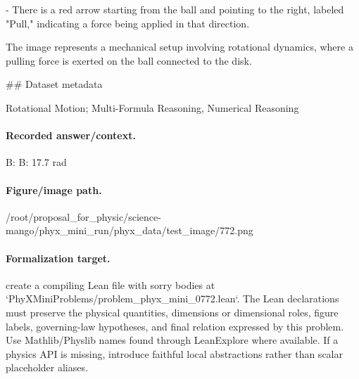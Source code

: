 - There is a red arrow starting from the ball and pointing to the right, labeled "Pull," indicating a force being applied in that direction.

The image represents a mechanical setup involving rotational dynamics, where a pulling force is exerted on the ball connected to the disk.

\#\# Dataset metadata

Rotational Motion; Multi-Formula Reasoning, Numerical Reasoning

\paragraph{Recorded answer/context.}
B: B: 17.7 rad

\paragraph{Figure/image path.}
/root/proposal\_for\_physic/science-mango/phyx\_mini\_run/phyx\_data/test\_image/772.png

\paragraph{Formalization target.}
create a compiling Lean file with sorry bodies at `PhyXMiniProblems/problem\_phyx\_mini\_0772.lean`. The Lean declarations must preserve the physical quantities, dimensions or dimensional roles, figure labels, governing-law hypotheses, and final relation expressed by this problem.
Use Mathlib/Physlib names found through LeanExplore where available. If a physics API is missing, introduce faithful local abstractions rather than scalar placeholder aliases.

